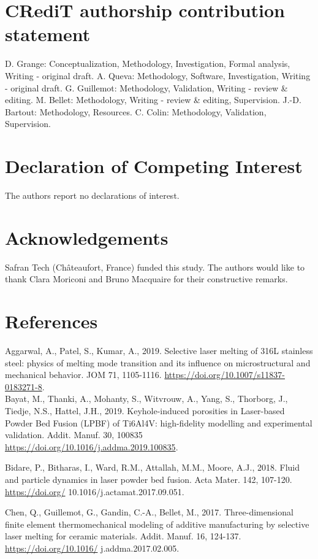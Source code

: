 \documentclass[10pt]{article}
\begin{document}
\section*{CRediT authorship contribution statement}
D. Grange: Conceptualization, Methodology, Investigation, Formal analysis, Writing - original draft. A. Queva: Methodology, Software, Investigation, Writing - original draft. G. Guillemot: Methodology, Validation, Writing - review \& editing. M. Bellet: Methodology, Writing - review \& editing, Supervision. J.-D. Bartout: Methodology, Resources. C. Colin: Methodology, Validation, Supervision.

\section*{Declaration of Competing Interest}
The authors report no declarations of interest.

\section*{Acknowledgements}
Safran Tech (Châteaufort, France) funded this study. The authors would like to thank Clara Moriconi and Bruno Macquaire for their constructive remarks.

\section*{References}
Aggarwal, A., Patel, S., Kumar, A., 2019. Selective laser melting of 316L stainless steel: physics of melting mode transition and its influence on microstructural and mechanical behavior. JOM 71, 1105-1116. \href{https://doi.org/10.1007/s11837-0183271-8}{https://doi.org/10.1007/s11837-0183271-8}.\\
Bayat, M., Thanki, A., Mohanty, S., Witvrouw, A., Yang, S., Thorborg, J., Tiedje, N.S., Hattel, J.H., 2019. Keyhole-induced porosities in Laser-based Powder Bed Fusion (LPBF) of Ti6Al4V: high-fidelity modelling and experimental validation. Addit. Manuf. 30, 100835 \href{https://doi.org/10.1016/j.addma.2019.100835}{https://doi.org/10.1016/j.addma.2019.100835}.

Bidare, P., Bitharas, I., Ward, R.M., Attallah, M.M., Moore, A.J., 2018. Fluid and particle dynamics in laser powder bed fusion. Acta Mater. 142, 107-120. \href{https://doi.org/}{https://doi.org/} 10.1016/j.actamat.2017.09.051.

Chen, Q., Guillemot, G., Gandin, C.-A., Bellet, M., 2017. Three-dimensional finite element thermomechanical modeling of additive manufacturing by selective laser melting for ceramic materials. Addit. Manuf. 16, 124-137. \href{https://doi.org/10.1016/}{https://doi.org/10.1016/} j.addma.2017.02.005.
\end{document}
